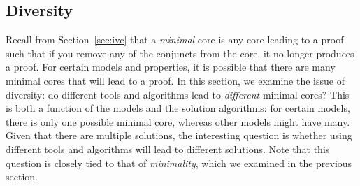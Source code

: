 \subsection{Diversity}
\label{sec:diversity}
Recall from Section~\ref{sec:ivc} that a {\em minimal} core is any core leading to a proof such that if you remove any of the conjuncts from the core, it no longer produces a proof.  For certain models and properties, it is possible that there are many minimal cores that will lead to a proof.  In this section, we examine the issue of diversity: do different tools and algorithms lead to {\em different} minimal cores?  This is both a function of the models and the solution algorithms: for certain models, there is only one possible minimal core, whereas other models might have many. Given that there are multiple solutions, the interesting question is whether using different tools and algorithms will lead to different solutions.  Note that this question is closely tied to that of {\em minimality}, which we examined in the previous section.

